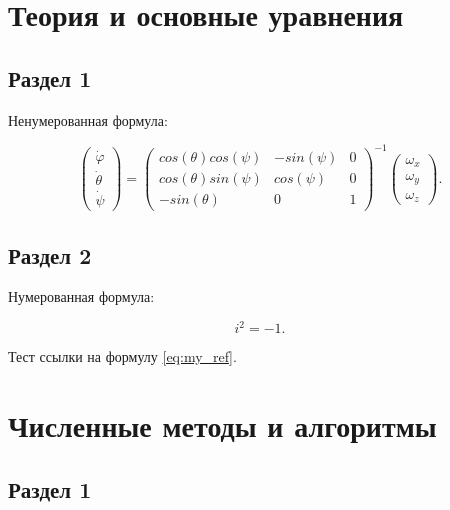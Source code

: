 \documentclass[a4paper,14pt]{extarticle}
\begin{document}
\section{Теория и основные уравнения}

\subsection{Раздел 1}

Ненумерованная формула:

\begin{equation}
    \begin{pmatrix} \dot{\varphi}\\ \dot{\theta} \\ \dot{\psi} \end{pmatrix}
    = \begin{pmatrix}
        cos(\theta)cos(\psi) & -sin(\psi) & 0 \\
        cos(\theta)sin(\psi) & cos(\psi)  & 0 \\
        -sin(\theta)         & 0         &  1
    \end{pmatrix}^{-1}
    \begin{pmatrix} \omega_x\\ \omega_y \\ \omega_z \end{pmatrix}.
\end{equation}

\subsection{Раздел 2}

Нумерованная формула:

\begin{equation}
    i^2 = -1.
    \label{eq:my_ref}
\end{equation}

Тест ссылки на формулу \ref{eq:my_ref}.

\pagebreak
\section{Численные методы и алгоритмы}

\subsection{Раздел 1}
\end{document}
